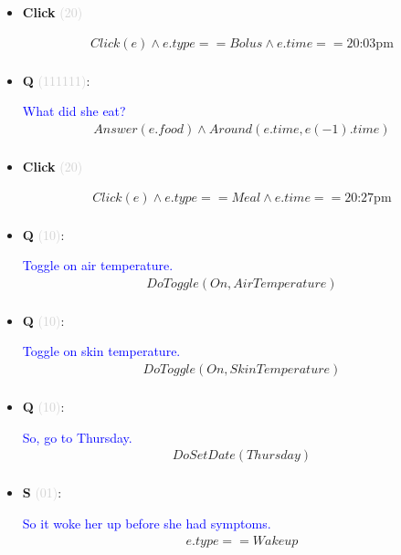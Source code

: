\documentclass[11pt]{article}
\newcounter{CQ}
\newcounter{CS}
\newcounter{CClick}
\newcommand{\key}[1]{\textcolor{lightgray}{#1}}
\begin{document}
\begin{itemize}
	
	\item
	\textbf{Click\theCClick} \key{(20)} \addtocounter{CClick}{1}
	\begin{multline*}
	Click(e) \wedge e.type == Bolus \wedge e.time == \mbox{20:03pm}  \\
	\end{multline*}
	
	
	\item
	\textbf{Q\theCQ} \key{(111111)}: \addtocounter{CQ}{1}
	\textcolor{blue}{ What did she eat? }
	\begin{multline*}
    Answer(e.food) \wedge Around(e.time, e(-1).time) \\ 
	\end{multline*}
	
	\item
	\textbf{Click\theCClick} \key{(20)} \addtocounter{CClick}{1}
	\begin{multline*}
	Click(e) \wedge e.type == Meal \wedge e.time == \mbox{20:27pm} \\
	\end{multline*}
	
	
	\item
	\textbf{Q\theCQ} \key{(10)}: \addtocounter{CQ}{1}
	\textcolor{blue}{ Toggle on air temperature. }
	\begin{multline*}
	DoToggle(On, AirTemperature) \\
	\end{multline*}

	\item
	\textbf{Q\theCQ} \key{(10)}: \addtocounter{CQ}{1}
	\textcolor{blue}{ Toggle on skin temperature. }	
	\begin{multline*}
	DoToggle(On, SkinTemperature) \\
	\end{multline*}
	
	
	\item
	\textbf{Q\theCQ} \key{(10)}: \addtocounter{CQ}{1}
	\textcolor{blue}{ So, go to Thursday. }
	\begin{multline*}
	DoSetDate(Thursday) \\
	\end{multline*}
	
	
	
	\item
	\textbf{S\theCS} \key{(01)}: \addtocounter{CS}{1}
	\textcolor{blue}{ So it woke her up before she had symptoms. }
	\begin{multline*}
	e.type==Wakeup \\
	\end{multline*}
	

\end{itemize}
\end{document}
